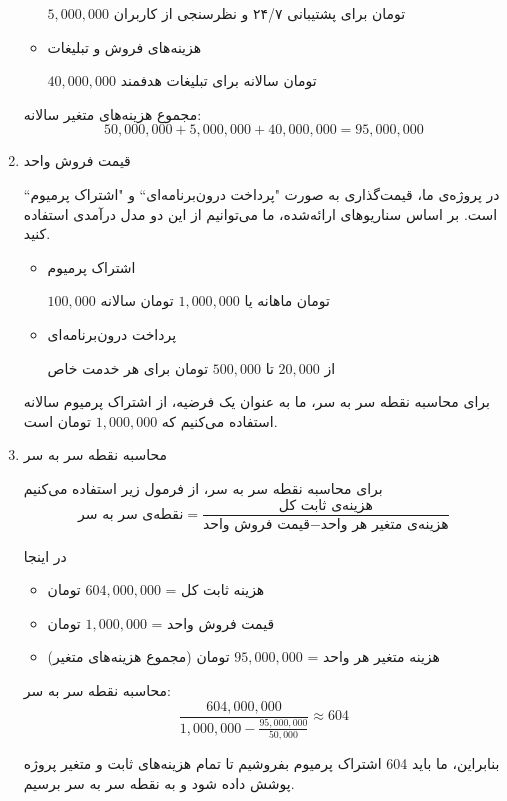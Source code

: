 \documentclass[dvipsnames, svgnames, x11names, 11pt]{article}
\begin{document}
\begin{enumerate}
\begin{itemize}
$5,000,000$
تومان برای پشتیبانی ۲۴/۷ و نظرسنجی از کاربران

\item 
هزینه‌های فروش و تبلیغات

$40,000,000$
تومان سالانه برای تبلیغات هدفمند
\end{itemize}

مجموع هزینه‌های متغیر سالانه:
\begin{equation*}
50,000,000 + 5,000,000 + 40,000,000 = 95,000,000
\end{equation*}

\item 
قیمت فروش واحد 

در پروژه‌ی ما، قیمت‌گذاری به صورت "پرداخت درون‌برنامه‌ای`` و "اشتراک پرمیوم`` است. بر اساس سناریوهای ارائه‌شده، ما می‌توانیم از این دو مدل درآمدی استفاده کنید.

\begin{itemize}
\item 
اشتراک پرمیوم

$100,000$
تومان ماهانه یا
$1,000,000$
تومان سالانه

\item 
پرداخت درون‌برنامه‌ای

از
$20,000$
تا
$500,000$
تومان برای هر خدمت خاص
\end{itemize}

برای محاسبه نقطه سر به سر، ما به عنوان یک فرضیه، از اشتراک پرمیوم سالانه استفاده می‌کنیم که
$1,000,000$
تومان است.

\item 
محاسبه نقطه سر به سر 

برای محاسبه نقطه سر به سر، از فرمول زیر استفاده می‌کنیم
\begin{equation}
\text{نقطه‌ی سر به سر} =
\frac{\text{هزینه‌ی ثابت کل}}{\text{قیمت فروش واحد} - \text{هزینه‌ی متغیر هر واحد}}
\end{equation}

در اینجا
\begin{itemize}
\item 
هزینه ثابت کل = $604,000,000$ تومان

\item 
قیمت فروش واحد = $1,000,000$ تومان

\item 
هزینه متغیر هر واحد = $95,000,000$ تومان (مجموع هزینه‌های متغیر)
\end{itemize}

محاسبه نقطه سر به سر:
\begin{equation}
\frac{604,000,000}{1,000,000 - \frac{95,000,000}{50,000}} \approx 604
\end{equation}

بنابراین، ما باید 604 اشتراک پرمیوم بفروشیم تا تمام هزینه‌های ثابت و متغیر پروژه پوشش داده شود و به نقطه سر به سر برسیم.
\end{enumerate}
\end{document}
